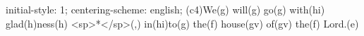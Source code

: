 initial-style: 1;
centering-scheme: english;
(c4)We(g) will(g) go(g) with(hi) glad(h)ness(h) <sp>*</sp>(,) in(hi)to(g) the(f) house(gv) of(gv) the(f) Lord.(e)
